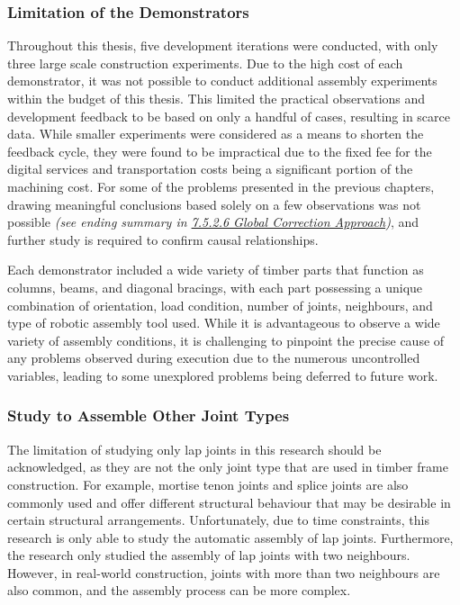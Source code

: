 \documentclass[11pt]{book}
\begin{document}
\subsubsection{Limitation of the Demonstrators}

Throughout this thesis, five development iterations were conducted, with only three large scale construction experiments. Due to the high cost of each demonstrator, it was not possible to conduct additional assembly experiments within the budget of this thesis. This limited the practical observations and development feedback to be based on only a handful of cases, resulting in scarce data. While smaller experiments were considered as a means to shorten the feedback cycle, they were found to be impractical due to the fixed fee for the digital services and transportation costs being a significant portion of the machining cost. For some of the problems presented in the previous chapters, drawing meaningful conclusions based solely on a few observations was not possible \textit{(see ending summary in \uline{7.5.2.6 Global Correction Approach})}, and further study is required to confirm causal relationships. 

Each demonstrator included a wide variety of timber parts that function as columns, beams, and diagonal bracings, with each part possessing a unique combination of orientation, load condition, number of joints, neighbours, and type of robotic assembly tool used. While it is advantageous to observe a wide variety of assembly conditions, it is challenging to pinpoint the precise cause of any problems observed during execution due to the numerous uncontrolled variables, leading to some unexplored problems being deferred to future work.

\subsubsection{Study to Assemble Other Joint Types}

The limitation of studying only lap joints in this research should be acknowledged, as they are not the only joint type that are used in timber frame construction. For example, mortise tenon joints and splice joints are also commonly used and offer different structural behaviour that may be desirable in certain structural arrangements. Unfortunately, due to time constraints, this research is only able to study the automatic assembly of lap joints. Furthermore, the research only studied the assembly of lap joints with two neighbours. However, in real-world construction, joints with more than two neighbours are also common, and the assembly process can be more complex. 
\end{document}
